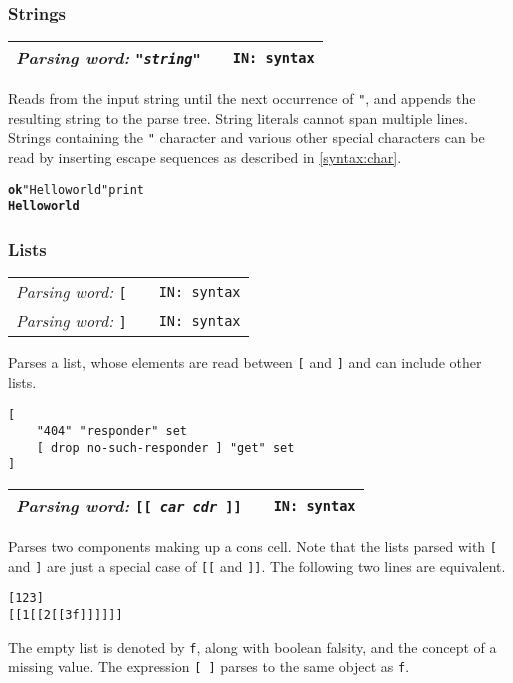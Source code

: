 \documentclass{report}
\newcommand{\parsingword}[3]{\index{#1}
\emph{Parsing word:} \texttt{#2} &&\texttt{IN: #3}}
\newcommand{\wordtable}[1]{

\begin{tabularx}{12cm}[t]{lXr}
\hline
#1\\
\hline
\end{tabularx}

}
\begin{document}
\subsubsection{\label{string-literals}Strings}

\newcommand{\stringglos}{}
\stringglos
\wordtable{
\parsingword{"}{"\emph{string}"}{syntax}
}
Reads from the input string until the next occurrence of
\texttt{"}, and appends the resulting string to the parse tree. String literals cannot span multiple lines.
Strings containing
the \texttt{"} character and various other special characters can be read by
inserting escape sequences as described in \ref{syntax:char}.
\begin{alltt}
\textbf{ok} "Hello world" print
\textbf{Hello world}
\end{alltt}

\subsubsection{\label{listsyntax}Lists}
\newcommand{\listglos}{
}
\listglos
\wordtable{
\parsingword{openbracket}{[}{syntax}\\
\parsingword{closebracket}{]}{syntax}
}
Parses a list, whose elements are read between \texttt{[} and \texttt{]} and can include other lists.
\begin{verbatim}
[
    "404" "responder" set
    [ drop no-such-responder ] "get" set
]
\end{verbatim}
\newcommand{\consglos}{}
\consglos
\wordtable{
\parsingword{conssyntax}{[[ \emph{car} \emph{cdr} ]]}{syntax}
}
Parses two components making up a cons cell. Note that the lists parsed with \texttt{[} and \texttt{]} are just a special case of \texttt{[[} and \texttt{]]}. The following two lines are equivalent.
\begin{alltt}
[ 1 2 3 ]
[[ 1 [[ 2 [[ 3 f ]] ]] ]]
\end{alltt}
The empty list is denoted by \texttt{f}, along with boolean falsity, and the concept of a missing value. The expression \texttt{[ ]} parses to the same object as \texttt{f}.
\end{document}
